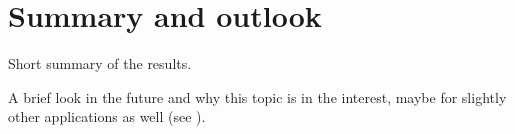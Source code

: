 
\chapter{Summary and outlook}
\label{chap:summary}

Short summary of the results. 

A brief look in the future and why this topic is in the interest, maybe for slightly other applications as well (see \autocite{gaoTransientStabilityAnalysis2024}).